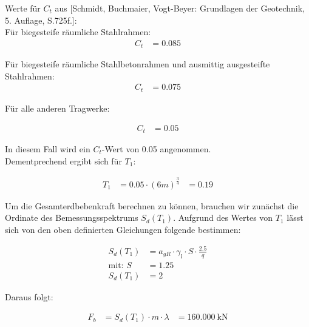 \begin{solution}
    Werte für $C_t$ aus [Schmidt, Buchmaier, Vogt-Beyer: Grundlagen der Geotechnik, 5. Auflage, S.725f.]:
    \\
    Für biegesteife räumliche Stahlrahmen:
    \begin{align}
        C_t &= 0.085  
    \end{align}

    Für biegesteife räumliche Stahlbetonrahmen und ausmittig ausgesteifte Stahlrahmen:\\
    
    \begin{align}
        C_t &= 0.075 
    \end{align}

    Für alle anderen Tragwerke:

    \begin{align}
        C_t &= 0.05 
    \end{align}

    In diesem Fall wird ein $C_t$-Wert von 0.05 angenommen. \\
    Dementprechend ergibt sich für $T_1$:

    \begin{align*}
        T_1 &= 0.05 \cdot {(6m)}^{\frac{3}{4}} &= 0.19
    \end{align*}

    Um die Gesamterdbebenkraft berechnen zu können, brauchen wir zunächst die Ordinate des Bemessungsspektrums $S_d(T_1)$.
    Aufgrund des Wertes von $T_1$ lässt sich von den oben definierten Gleichungen folgende bestimmen: 

    \begin{align}
        S_d(T_1) &= a_{gR} \cdot \gamma_l \cdot S \cdot \frac{2.5}{q}\\
        \text{mit: } S &= 1.25 \\
        S_d(T_1) &= 2 
    \end{align}

    Daraus folgt:

    \begin{align}
        F_b &= S_d(T_1) \cdot m \cdot \lambda &= \SI{160.000}{\kilo \newton}
    \end{align}
\end{solution}
